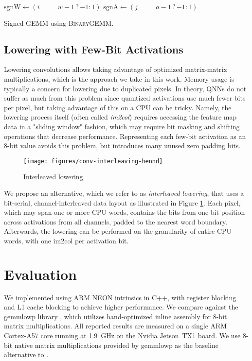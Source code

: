 \documentclass[sigconf]{acmart}
\begin{document}
\begin{algorithm}[t]
	\centering
	\footnotesize
	\begin{algorithmic}
		\algrenewcommand\algorithmicindent{1.0em}%
		\State $\mathrm{sgnW} \gets (i == w-1 \mathrel{?} -1 : 1)$
		\State $\mathrm{sgnA} \gets (j == a-1 \mathrel{?} -1 : 1)$
		\State {}
		\EndFor
		\EndFor
		\EndFunction
	\end{algorithmic}
	\caption{Signed  GEMM using \textsc{BinaryGEMM}.}
	\label{alg:bsgemm}
\end{algorithm}


\subsection{Lowering with Few-Bit Activations}
Lowering convolutions \cite{convlowering} allows taking advantage of optimized matrix-matrix multiplications, which is the approach we take in this work.
Memory usage is typically a concern for lowering due to duplicated pixels.
In theory, QNNs do not suffer as much from this problem since quantized activations use much fewer bits per pixel, but taking advantage of this on a CPU can be tricky.
Namely, the lowering process itself (often called \emph{im2col}) requires accessing the feature map data in a "sliding window" fashion, which may require bit masking and shifting operations that decrease performance.
Representing each few-bit activation as an 8-bit value avoids this problem, but introduces many unused zero padding bits.
\begin{figure}
	\texttt{[image: figures/conv-interleaving-hennd]}
	\caption{Interleaved lowering.}
	\label{fig:interleaved}
\end{figure}

We propose an alternative, which we refer to as \emph{interleaved lowering}, that uses a bit-serial, channel-interleaved data layout as illustrated in Figure \ref{fig:interleaved}.
Each pixel, which may span one or more CPU words, contains the bits from one bit position across activations from all channels, padded to the nearest word boundary.
Afterwards, the lowering can be performed on the granularity of entire CPU words, with one im2col per activation bit.

\section{Evaluation}
We implemented \ours{} using ARM NEON intrinsics in C++, with register blocking and L1 cache blocking to achieve higher performance.
We compare against the gemmlowp library \cite{gemmlowp}, which utilizes hand-optimized inline assembly for 8-bit matrix multiplications.
All reported results are measured on a single ARM Cortex-A57 core running at 1.9~GHz on the Nvidia Jetson~TX1 board.
We use 8-bit native matrix multiplications provided by gemmlowp \cite{gemmlowp} as the baseline alternative to \ours{}.
\end{document}
